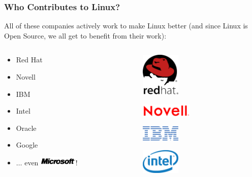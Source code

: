 \documentclass{beamer}
\begin{document}
\begin{frame}
  \frametitle{Who Contributes to Linux?}
  All of these companies actively work to make Linux better (and since Linux is Open Source, we all get to benefit from their work):
  \begin{columns}
    
    \begin{Large}
      \begin{itemize}
      \item Red Hat
      \item Novell
      \item IBM
      \item Intel
      \item Oracle
      \item Google
      \item $\ldots$
        even \includegraphics[width=0.3\textwidth]{img/microsoft}!
      \end{itemize}
    \end{Large}

    \begin{center}
      \includegraphics[width=0.3\textwidth]{img/redhat}

      \includegraphics[width=0.4\textwidth]{img/novell}

      \includegraphics[width=0.3\textwidth]{img/ibm}

      \includegraphics[width=0.3\textwidth]{img/intel}


\end{center}
\end{columns}
\end{frame}
\end{document}
